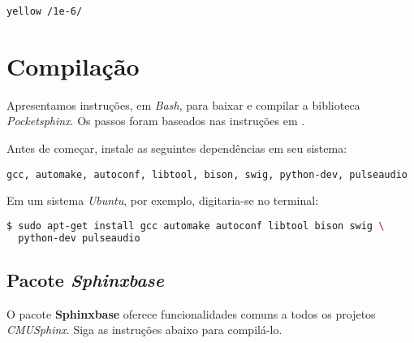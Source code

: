 \begin{center}
\texttt{yellow /1e-6/}
\end{center}


\section{Compilação}
\label{sphinxCompile}

Apresentamos instruções, em \textit{Bash}, para baixar e compilar a biblioteca \textit{Pocketsphinx}. Os passos foram baseados nas instruções em \citep{pocketsphinxInstallUse}.

Antes de começar, instale as seguintes dependências em seu sistema:

\begin{center}
\footnotesize\texttt{gcc, automake, autoconf, libtool, bison, swig, python-dev, pulseaudio}
\end{center}

Em um sistema \emph{Ubuntu}, por exemplo, digitaria-se no terminal:

\begin{lstlisting}[language=Bash]
$ sudo apt-get install gcc automake autoconf libtool bison swig \
  python-dev pulseaudio
\end{lstlisting}


\subsection{Pacote \textit{Sphinxbase}}
\label{sphinxbaseCompile}

O pacote \textbf{Sphinxbase} oferece funcionalidades comuns a todos os projetos \textit{CMUSphinx}. Siga as instruções abaixo para compilá-lo.

